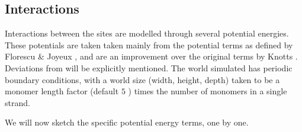 \subsection{Interactions}

Interactions between the sites are modelled through several potential energies.
These potentials are taken taken mainly from the potential terms as defined by Florescu \& Joyeux \cite{florescu2011thermal}, and are an improvement over the original terms by Knotts \etal \cite{knotts2007coarse}. Deviations from \cite{florescu2011thermal} will be explicitly mentioned. The world simulated has periodic boundary conditions, with a world size (width, height, depth) taken to be a monomer length factor (default $5$ \Angstrom) times the number of monomers in a single strand.

We will now sketch the specific potential energy terms, one by one.



